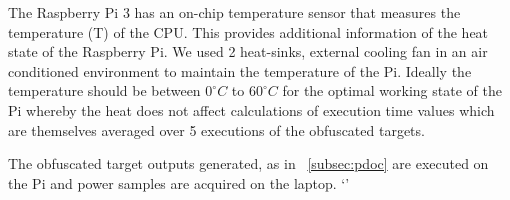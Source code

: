 The Raspberry Pi 3 has an on-chip temperature sensor that measures the temperature (T) of the CPU. This provides additional information of the heat state of the Raspberry Pi. We used 2 heat-sinks, external cooling fan in an air conditioned environment to maintain the temperature of the Pi. Ideally the temperature should be between $0^{\circ}C$ to $60^{\circ}C$ for the optimal working state of the Pi whereby the heat does not affect calculations of  execution time values which are themselves averaged over 5 executions of the obfuscated targets.

The obfuscated target outputs generated, as in ~\ref{subsec:pdoc} are executed on the Pi and power samples are acquired on the laptop.
`'